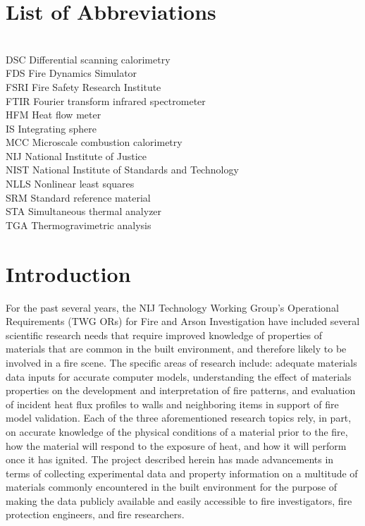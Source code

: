 \documentclass[12pt,oneside]{book}
\begin{document}
\chapter*{List of Abbreviations}

\begin{tabbing}
\hspace{1.5in} \= \\
DSC 	\> Differential scanning calorimetry \\
FDS	    \> Fire Dynamics Simulator \\
FSRI    \> Fire Safety Research Institute \\
FTIR 	\> Fourier transform infrared spectrometer \\
HFM 	\> Heat flow meter \\
IS 		\> Integrating sphere \\
MCC 	\> Microscale combustion calorimetry \\
NIJ 	\> National Institute of Justice \\
NIST    \> National Institute of Standards and Technology \\
NLLS    \> Nonlinear least squares \\
SRM 	\> Standard reference material \\
STA 	\> Simultaneous thermal analyzer \\
TGA 	\> Thermogravimetric analysis \\
\end{tabbing}

\newpage

\setcounter{page}{1}

\newpage
\mainmatter
\newpage

\chapter{Introduction}
\label{sec:introduction}

For the past several years, the NIJ Technology Working Group's Operational Requirements (TWG ORs) for Fire and Arson Investigation have included several scientific research needs that require improved knowledge of properties of materials that are common in the built environment, and therefore likely to be involved in a fire scene. The specific areas of research include: adequate materials data inputs for accurate computer models, understanding the effect of materials properties on the development and interpretation of fire patterns, and evaluation of incident heat flux profiles to walls and neighboring items in support of fire model validation. Each of the three aforementioned research topics rely, in part, on accurate knowledge of the physical conditions of a material prior to the fire, how the material will respond to the exposure of heat, and how it will perform once it has ignited. The project described herein has made advancements in terms of collecting experimental data and property information on a multitude of materials commonly encountered in the built environment for the purpose of making the data publicly available and easily accessible to fire investigators, fire protection engineers, and fire researchers.
\end{document}
